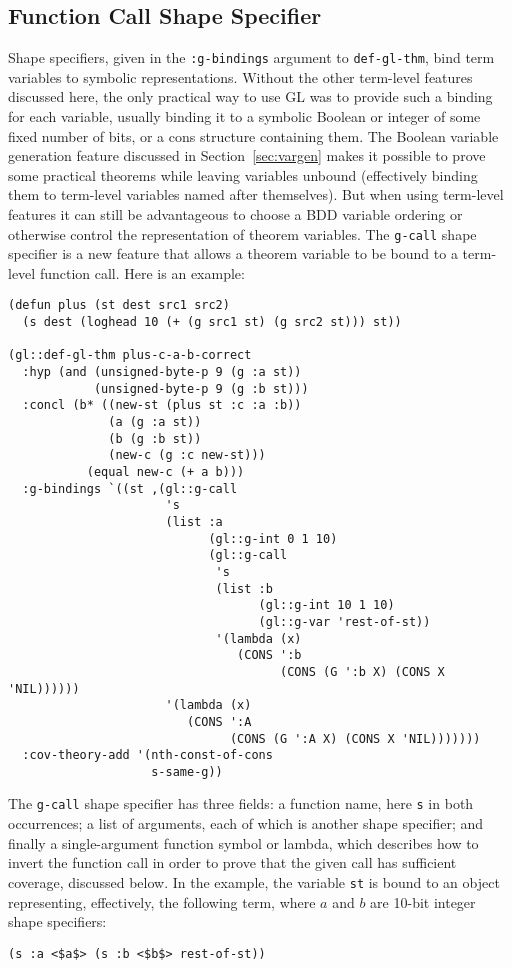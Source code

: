 \documentclass[submission,copyright,creativecommons]{eptcs}
\begin{document}
\subsection{Function Call Shape Specifier}
\label{sec:callshapespec}

Shape specifiers, given in the \texttt{:g-bindings} argument to
\texttt{def-gl-thm}, bind term variables to symbolic representations.
Without the other term-level features discussed here, the only
practical way to use GL was to provide such a binding for each
variable, usually binding it to a symbolic Boolean or integer of some
fixed number of bits, or a cons structure containing them.  The
Boolean variable generation feature discussed in
Section~\ref{sec:vargen} makes it possible to prove some practical
theorems while leaving variables unbound (effectively binding them to
term-level variables named after themselves).  But when using
term-level features it can still be advantageous to choose a BDD
variable ordering or otherwise control the representation of theorem
variables.  The \texttt{g-call} shape specifier is a new feature that
allows a theorem variable to be bound to a term-level function call.
Here is an example:
\begin{verbatim}
(defun plus (st dest src1 src2)
  (s dest (loghead 10 (+ (g src1 st) (g src2 st))) st))

(gl::def-gl-thm plus-c-a-b-correct
  :hyp (and (unsigned-byte-p 9 (g :a st))
            (unsigned-byte-p 9 (g :b st)))
  :concl (b* ((new-st (plus st :c :a :b))
              (a (g :a st))
              (b (g :b st))
              (new-c (g :c new-st)))
           (equal new-c (+ a b)))
  :g-bindings `((st ,(gl::g-call
                      's
                      (list :a
                            (gl::g-int 0 1 10)
                            (gl::g-call
                             's
                             (list :b
                                   (gl::g-int 10 1 10)
                                   (gl::g-var 'rest-of-st))
                             '(lambda (x)
                                (CONS ':b
                                      (CONS (G ':b X) (CONS X 'NIL))))))
                      '(lambda (x)
                         (CONS ':A
                               (CONS (G ':A X) (CONS X 'NIL)))))))
  :cov-theory-add '(nth-const-of-cons
                    s-same-g))
\end{verbatim}
The \texttt{g-call} shape specifier has three fields: a function name,
here \texttt{s} in both occurrences; a list of arguments, each of
which is another shape specifier; and finally a single-argument
function symbol or lambda, which describes how to invert the function
call in order to prove that the given call has sufficient coverage,
discussed below.  In the example, the variable \texttt{st} is bound to
an object representing, effectively, the following term, where $a$ and
$b$ are 10-bit integer shape specifiers:
\begin{lstlisting}
(s :a <$a$> (s :b <$b$> rest-of-st))
\end{lstlisting}
\end{document}
